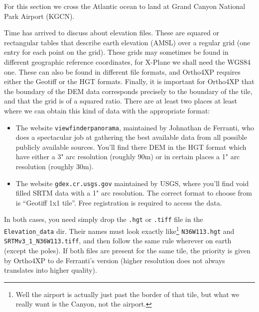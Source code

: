 \documentclass[12pt]{article}
\begin{document}
For this section we cross the Atlantic ocean to land at Grand Canyon National Park Airport (KGCN).

Time has arrived to discuss about elevation files.  These are squared or rectangular tables that describe earth elevation (AMSL) over a regular grid (one entry for each point on the grid). These grids may sometimes be found in different geographic reference coordinates, for X-Plane we shall need the {WGS84} one. These can also be found in different file formats, and Ortho4XP requires either the Geotiff or the HGT formats. Finally, it is important for Ortho4XP that the boundary of the DEM data corresponds precisely to the boundary of the tile, and that the grid is of a squared ratio.
There are at least two places at least where we can obtain this kind of data with the appropriate format:
\begin{itemize}
  \item The website {\tt viewfinderpanorama}, maintained by Johnathan de Ferranti, who does a spectacular job at gathering the best available data from all possible publicly available sources. You'll find there DEM in the HGT format which have either a 3" arc resolution (roughly 90m) or in certain places a 1" arc resolution (roughly 30m).
  \item The website {\tt gdex.cr.usgs.gov} maintained by USGS, where you'll find void filled SRTM data with a 1" arc resolution. The correct format to choose from is ``Geotiff 1x1 tile''. Free registration is required to access the data.
\end{itemize}
In both cases, you need simply drop the {\tt .hgt} or {\tt .tiff} file in the {\tt Elevation\_data} dir.
Their names must look exactly like\footnote{Well the airport is actually just past the border of that tile, but what we really want is the Canyon, not the airport.} {\tt N36W113.hgt} and {\tt SRTMv3\_1\_N36W113.tiff}, and then follow the same rule wherever on earth (except the poles). If both files are present for the same tile, the priority is given by Ortho4XP to de Ferranti's version (higher resolution does not always translates into higher quality).
\end{document}
